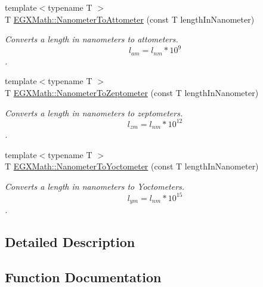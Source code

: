 \begin{DoxyCompactItemize}
{\footnotesize template$<$typename T $>$ }\\T \mbox{\hyperlink{group___e_g_x_math-_conversions-_length_conversions-_nanometer-_s_i_ga6bb90e8a7f98c79dc2ebbb8a46535fe0}{E\+G\+X\+Math\+::\+Nanometer\+To\+Attometer}} (const T length\+In\+Nanometer)
\begin{DoxyCompactList}\small\item\em Converts a length in nanometers to attometers. \[ l_{am}=l_{nm} * 10^{9} \]. \end{DoxyCompactList}\item 
{\footnotesize template$<$typename T $>$ }\\T \mbox{\hyperlink{group___e_g_x_math-_conversions-_length_conversions-_nanometer-_s_i_ga3104d856008f94fc14378e95cfbe771f}{E\+G\+X\+Math\+::\+Nanometer\+To\+Zeptometer}} (const T length\+In\+Nanometer)
\begin{DoxyCompactList}\small\item\em Converts a length in nanometers to zeptometers. \[ l_{zm}=l_{nm} * 10^{12} \]. \end{DoxyCompactList}\item 
{\footnotesize template$<$typename T $>$ }\\T \mbox{\hyperlink{group___e_g_x_math-_conversions-_length_conversions-_nanometer-_s_i_gab447c3aa3d215a1030a63e28f9aca1c1}{E\+G\+X\+Math\+::\+Nanometer\+To\+Yoctometer}} (const T length\+In\+Nanometer)
\begin{DoxyCompactList}\small\item\em Converts a length in nanometers to Yoctometers. \[ l_{ym}=l_{nm} * 10^{15} \]. \end{DoxyCompactList}\end{DoxyCompactItemize}


\subsection{Detailed Description}


\subsection{Function Documentation}
\mbox{\label{group___e_g_x_math-_conversions-_length_conversions-_nanometer-_s_i_ga6bb90e8a7f98c79dc2ebbb8a46535fe0}} 
